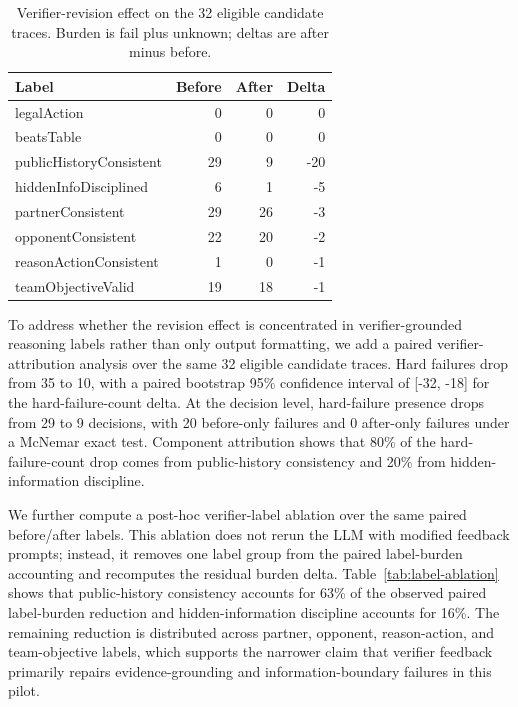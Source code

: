 \documentclass[sigconf,anonymous,review]{acmart}
\begin{document}
\begin{table}[t]
\centering
\caption{Verifier-revision effect on the 32 eligible candidate traces. Burden is fail plus unknown; deltas are after minus before.}
\label{tab:revision}
\scriptsize
\begin{tabular}{lrrr}
\toprule
Label & Before & After & Delta \\
\midrule
legalAction & 0 & 0 & 0 \\
beatsTable & 0 & 0 & 0 \\
publicHistoryConsistent & 29 & 9 & -20 \\
hiddenInfoDisciplined & 6 & 1 & -5 \\
partnerConsistent & 29 & 26 & -3 \\
opponentConsistent & 22 & 20 & -2 \\
reasonActionConsistent & 1 & 0 & -1 \\
teamObjectiveValid & 19 & 18 & -1 \\
\bottomrule
\end{tabular}
\end{table}

To address whether the revision effect is concentrated in verifier-grounded reasoning labels rather than only output formatting, we add a paired verifier-attribution analysis over the same 32 eligible candidate traces. Hard failures drop from 35 to 10, with a paired bootstrap 95\% confidence interval of [-32, -18] for the hard-failure-count delta. At the decision level, hard-failure presence drops from 29 to 9 decisions, with 20 before-only failures and 0 after-only failures under a McNemar exact test. Component attribution shows that 80\% of the hard-failure-count drop comes from public-history consistency and 20\% from hidden-information discipline.

We further compute a post-hoc verifier-label ablation over the same paired before/after labels. This ablation does not rerun the LLM with modified feedback prompts; instead, it removes one label group from the paired label-burden accounting and recomputes the residual burden delta. Table~\ref{tab:label-ablation} shows that public-history consistency accounts for 63\% of the observed paired label-burden reduction and hidden-information discipline accounts for 16\%. The remaining reduction is distributed across partner, opponent, reason-action, and team-objective labels, which supports the narrower claim that verifier feedback primarily repairs evidence-grounding and information-boundary failures in this pilot.
\end{document}
